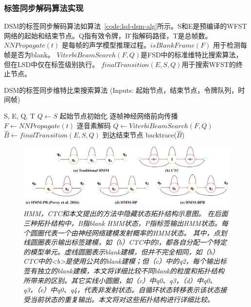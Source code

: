 \subsubsection{标签同步解码算法实现}
\label{chap:lsd-lsd-ctc-alg}

DSM的标签同步解码算法如算法~\ref{code:lsd-dsm-alg}所示。S和E是预编译的WFST网络的起始和结束节点。Q指有效令牌，B ̂指解码路径，T是总帧数。$NNPropagate(t)$ 是每帧的声学模型推理过程。$isBlankFrame(F)$ 用于检测每帧是否为blank。 $ViterbiBeamSearch(F, Q)$是FSD中的标准维特比搜索算法，但在LSD中仅在标签级别执行。  $finalTransition(E,S,Q)$用于搜索WFST的终止节点\cite{hori2007efficient}。


\begin{algorithm}[ht]
\caption{DSM的标签同步维特比束搜索算法 \textcolor[rgb]{0,0.5,0}{(Inputs: 起始节点，结束节点，令牌队列，时间帧)}}
\label{code:lsd-dsm-alg}
\begin{algorithmic}[1]
 {S, E, Q, T}
\State $Q \leftarrow S$ \Comment \textcolor[rgb]{0,0.5,0}{起始节点初始化}
    \Comment \textcolor[rgb]{0,0.5,0}{逐帧神经网络前向传播}
\State $F \leftarrow NNPropagate(t)$
   \Comment \textcolor[rgb]{0,0.5,0}{逐音素解码}
\State  $Q\leftarrow ViterbiBeamSearch(F, Q)$
\EndIf
\EndFor
\State $\hat B\leftarrow finalTransition(E,S,Q)$ \Comment \textcolor[rgb]{0,0.5,0}{到达结束节点}
\State backtrace($\hat B$)
\EndProcedure
\end{algorithmic}
\end{algorithm}


\begin{figure}
  \centering
    \includegraphics[width=\linewidth]{figure/hmm-topo.png}
    \caption{\it 
    HMM，CTC和本文提出的方法中隐藏状态拓扑结构示意图。 在后面三种拓扑结构中，B指blank HMM状态，P指标签输出HMM状态。每个圆圈代表一个由神经网络建模发射概率的HMM状态。 其中，点划线圆圈表示输出标签建模，如（b）CTC中的l，都各自分配一个特定的模型单元。虚线圆圈表示blank建模，但并不完全相同，如（b）CTC中的<b>是使用公共的blank建模；但（c）中的q2，每个输出标签有独立的blank建模，本文将详细比较不同blank的粒度和拓扑结构所带来的区别。其它实线小圆圈，如（c）中q0、q3，（d）中q0、q3，（e）中q0、q4，代表非发射状态。自循环状态转移表示该状态接受当前状态的重复输出。本文将对这些拓扑结构进行详细比较。
    }
    \label{fig:hmm-topo}
\end{figure}

